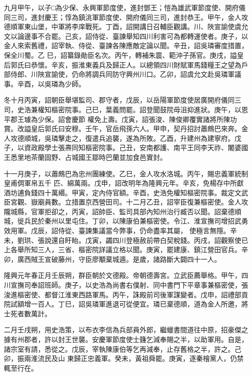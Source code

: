\begin{pinyinscope}
 九月甲午，以子□為少保、永興軍節度使，進封鄧王；愷為雄武軍節度使、開府儀同三司，進封慶王；惇為鎮洮軍節度使、開府儀同三司，進封恭王。甲午，金人攻德順軍東山堡，中軍將李庠戰死。丁酉，詔開講日召輔臣觀講。川、陜宣諭使虞允文以論邊事不合罷。己亥，詔侍從、臺諫舉知四川利害可為都轉運使者。庚子，以金人來索舊禮，詔宰執、侍從、臺諫各陳應敵定論以聞。辛丑，詔吳璘審度措置，保全川蜀。乙
 巳，詔纂錄勛臣名次。丙午，轉補朱震、範沖子孫官。庚戌，謚皇后郭氏曰恭懷。辛亥，振淮東義兵及歸正人。以總領四川財賦軍馬錢糧王之望為戶部侍郎、川陜宣諭使，仍命將調兵同防守興州川口。乙卯，詔虞允文赴吳璘軍議事。辛酉，以吳璘為少師。



 冬十月丙寅，詔朝臣舉堪監司、郡守者，戊辰，以岳陽軍節度使居廣開府儀同三司，史浩兼權知樞密院事。己巳，葉義問罷。詔登聞鼓院毋沮抑進狀。庚午，以恩平郡王璩為少保。詔會慶節
 權免上壽。戊寅，詔張浚、陳俊卿覆實諸將所陳功賞。改謚皇后郭氏曰安穆。壬午，官岳飛孫六人。甲申，契丹招討蕭鷓巴來奔。金人攻德順城，吳璘擊走之，復遣兵追襲，遂為所敗。乙酉，升建州為建寧府。戊子，以資政殿學士張燾同知樞密院事。己丑，安南都護、南平王同李天祚、闍婆國王悉里地茶蘭固野、占城國王鄒時巴蘭並加食邑實封。



 十一月庚子，以蕭鷓巴為忠州團練使。乙巳，金人攻水洛城。丙午，賜忠義軍統制皇甫倜軍帛五千
 匹、綿萬兩。戊申，詔改明年為隆興元年。辛亥，免楊存中所獻酒坊逋負錢四十萬緡。甲寅，定內侍官額。辛酉，史浩免權知樞密院事。裁定文武臣宮觀、嶽廟員數。立措置京西營田司。十二月乙丑，詔宰臣復兼樞密使。金人攻隴城縣，官軍拒卻之，丙寅，詔帥臣、監司具部內知州治行臧否以聞。詔棄德順城，徙兵民於秦州以里屯住。丁卯，以陳康伯兼樞密使。令江、淮宣撫司增招武勇效用軍。戊辰，詔侍從、臺諫集議當今弊事，仍命盡率其屬，
 使極言無隱。辛未，劉珙、張說還自盱眙。戊寅，蠲四川登極赦前帶白契稅錢。丙戌，詔觀察使已上各舉所知三人，三省、樞密院詳議立格以聞。庚寅，罷建康、鎮江營田官兵。辛卯，廣西賊王宣破藤州，守臣廖顒棄城遁。是歲，諸路斷大闢四十一人。



 隆興元年春正月壬辰朔，群臣朝於文德殿。帝朝德壽宮。立武臣薦舉格。甲午，四川宣撫司奉詔班師。庚子，以史浩為尚書右僕射、同中書門下平章事兼樞密使，張
 浚進樞密使、都督江淮東西路軍馬。丙午，誅殿前司後軍謀變者。戊申，詔禮部貢院試額增一百人。丁巳，詔吳璘軍進退可從便宜。璘已棄德順，道為金人所邀，將士死者數萬計。



 二月壬戌朔，用史浩策，以布衣李信為兵部員外郎，繼蠟書間道往中原，招豪傑之據有州郡者，許以封王世襲。安慶軍節度使士籛乞減奉賜之半，以助軍用。自是，諸宗室有請，悉從之。戊辰，宰執陳康伯等乞再減奉，止存舊格之半，許之。己卯，振兩淮流民及山
 東歸正忠義軍。癸未，黃祖舜罷。庚寅，逐秦檜黨人，仍禁輒至行在。




\end{pinyinscope}
